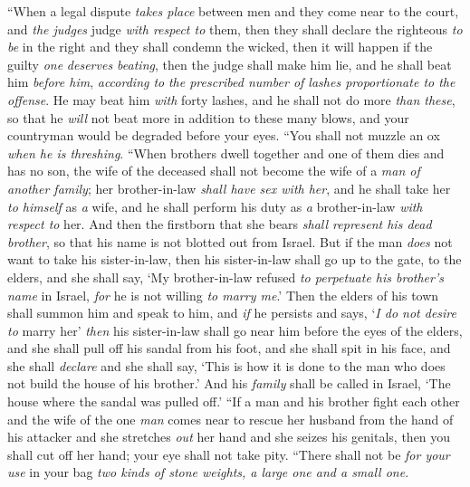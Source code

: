\begin{biblechapter} %
\verse “When a legal dispute \textit{takes place} between men and they come near to the court, and \textit{the judges} judge \textit{with respect to} them, then they shall declare the righteous \textit{to be} in the right and they shall condemn the wicked,
\verse then it will happen if the guilty \textit{one} \textit{deserves beating}, then the judge shall make him lie, and he shall beat him \textit{before him}, \textit{according to} \textit{the prescribed number of lashes proportionate to the offense}.
\verse He may beat him \textit{with} forty lashes, and he shall not do more \textit{than these}, so that he \textit{will} not beat more in addition to these many blows, and your countryman would be degraded before your eyes.
\verse “You shall not muzzle an ox \textit{when he is threshing}.
\verse “When brothers dwell together and one of them dies and has no son, the wife of the deceased shall not become the wife of a \textit{man of another family}; her brother-in-law \textit{shall have sex with her}, and he shall take her \textit{to himself} as \textit{a} wife, and he shall perform his duty as \textit{a} brother-in-law \textit{with respect to} her.
\verse And then the firstborn that she bears \textit{shall represent his dead brother}, so that his name is not blotted out from Israel.
\verse But if the man \textit{does} not want to take his sister-in-law, then his sister-in-law shall go up to the gate, to the elders, and she shall say, ‘My brother-in-law refused \textit{to perpetuate his brother’s name} in Israel, \textit{for} he is not willing \textit{to marry me}.’
\verse Then the elders of his town shall summon him and speak to him, and \textit{if} he persists and says, ‘\textit{I do not desire to} marry her’
\verse \textit{then} his sister-in-law shall go near him before the eyes of the elders, and she shall pull off his sandal from his foot, and she shall spit in his face, and she shall \textit{declare} and she shall say, ‘This is how it is done to the man who does not build the house of his brother.’
\verse And his \textit{family} shall be called in Israel, ‘The house where the sandal was pulled off.’
\verse “If a man and his brother fight each other and the wife of the one \textit{man} comes near to rescue her husband from the hand of his attacker and she stretches \textit{out} her hand and she seizes his genitals,
\verse then you shall cut off her hand; your eye shall not take pity.
\verse “There shall not be \textit{for your use} in your bag \textit{two kinds of stone weights, a large one and a small one}.

\end{biblechapter}
